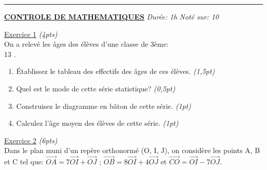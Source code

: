 \documentclass[12pt,a4paper]{book}
\newcommand{\matiere}{MATHEMATIQUES}
\begin{document}
\vspace{0,5cm}
\hrule
\vspace{0,5cm}

\textbf{\underline{CONTROLE DE \matiere}} \qquad \qquad  \qquad \qquad \emph{Durée: 1h} \qquad \qquad \emph{Noté sur: 10} \\
\par
\underline{Exercice 1} \emph{(4pts)}\\
On a relevé les âges des élèves d'une classe de 3ème:\\
13                                       .
\begin{enumerate}
\item Établissez le tableau des effectifs des âges de ces élèves. \emph{(1,5pt)}
\item Quel est le mode de cette série statistique? \emph{(0,5pt)}
\item Construisez le diagramme en bâton de cette série. \emph{(1pt)}
\item Calculez l'âge moyen des élèves de cette série. \emph{(1pt)}
\end{enumerate}
\vspace{0,5cm}
\underline{Exercice 2} \emph{(6pts)} \\
Dans le plan muni d'un repère orthonormé (O, I, J), on considère les points A, B et C tel que: $\overrightarrow{OA}=7\overrightarrow{OI}+\overrightarrow{OJ}$ ; $\overrightarrow{OB}=8\overrightarrow{OI}+4\overrightarrow{OJ}$ et $\overrightarrow{CO}=\overrightarrow{OI}-7\overrightarrow{OJ}$.
\end{document}
